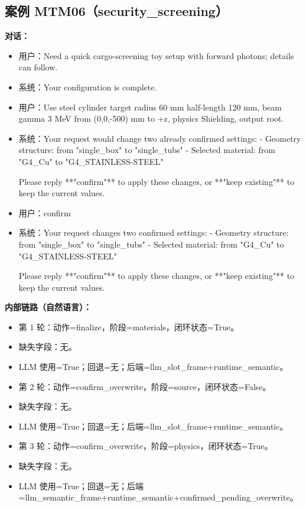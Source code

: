 \documentclass[11pt]{ctexart}
\begin{document}
\subsection{案例 MTM06（security\_screening）}
\textbf{对话：}
\begin{itemize}
\item 用户：Need a quick cargo-screening toy setup with forward photons; details can follow.
\item 系统：Your configuration is complete.
\item 用户：Use steel cylinder target radius 60 mm half-length 120 mm, beam gamma 3 MeV from (0,0,-500) mm to +z, physics Shielding, output root.
\item 系统：Your request would change two already confirmed settings:
- Geometry structure: from "single\_box" to "single\_tubs"
- Selected material: from "G4\_Cu" to "G4\_STAINLESS-STEEL"

Please reply **"confirm"** to apply these changes, or **"keep existing"** to keep the current values.
\item 用户：confirm
\item 系统：Your request changes two confirmed settings:
- Geometry structure: from "single\_box" to "single\_tubs"
- Selected material: from "G4\_Cu" to "G4\_STAINLESS-STEEL"

Please reply **"confirm"** to apply these changes, or **"keep existing"** to keep the current values.
\end{itemize}
\textbf{内部链路（自然语言）：}
\begin{itemize}
\item 第 1 轮：动作=finalize，阶段=materials，闭环状态=True。
\item 缺失字段：无。
\item LLM 使用=True；回退=无；后端=llm\_slot\_frame+runtime\_semantic。
\item 第 2 轮：动作=confirm\_overwrite，阶段=source，闭环状态=False。
\item 缺失字段：无。
\item LLM 使用=True；回退=无；后端=llm\_slot\_frame+runtime\_semantic。
\item 第 3 轮：动作=confirm\_overwrite，阶段=physics，闭环状态=True。
\item 缺失字段：无。
\item LLM 使用=True；回退=无；后端=llm\_semantic\_frame+runtime\_semantic+confirmed\_pending\_overwrite。
\end{itemize}
\end{document}

